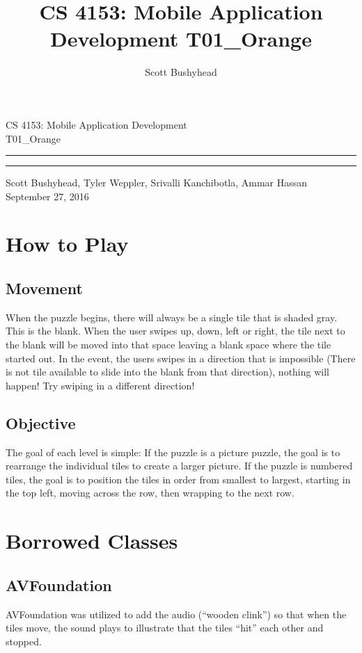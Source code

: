 \documentclass [10pt] {article}
\title{CS 4153: Mobile Application Development \newline
T01_Orange}
\author{Scott Bushyhead}
\begin{document}
\begin{flushright}
{\huge  CS 4153: Mobile Application Development}\\[5pt]
{\huge  T01\_Orange}\\[15pt]
\vspace{4pt}
\hrule
\vspace{4pt}
\hrule
{\large  Scott Bushyhead, Tyler Weppler, Srivalli Kanchibotla, Ammar Hassan}\\[5pt]
{\large September 27, 2016}\\[5pt]
\end{flushright}

\newpage


\section{How to Play}

\subsection{Movement}
When the puzzle begins, there will always be a single tile that is shaded gray.  This is the blank.  When the user swipes up, down, left or right, the tile next to the blank will be moved into that space leaving a blank space where the tile started out.  In the event, the users swipes in a direction that is impossible (There is not tile available to slide into the blank from that direction), nothing will happen!  Try swiping in a different direction!
\subsection{Objective}
The goal of each level is simple:  If the puzzle is a picture puzzle, the goal is to rearrange the individual tiles to create a larger picture.  If the puzzle is numbered tiles, the goal is to position the tiles in order from smallest to largest, starting in the top left, moving across the row, then wrapping to the next row.

\section{Borrowed Classes}

\subsection{AVFoundation}
AVFoundation was utilized to add the audio (``wooden clink'') so that when the tiles move, the sound plays to illustrate that the tiles ``hit'' each other and stopped.
\end{document}
